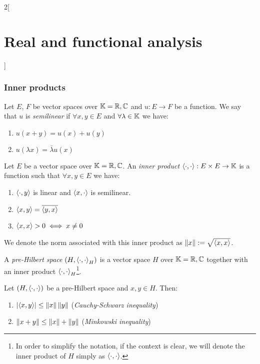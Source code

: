 \documentclass[../../../main_math.tex]{subfiles}
\begin{document}
\begin{multicols}{2}[\section{Real and functional analysis}]
  \subsubsection{Inner products}
  \begin{definition}
    Let $E$, $F$ be vector spaces over $\mathbb{K}=\mathbb{R},\mathbb{C}$ and $u:E\rightarrow F$ be a function. We say that $u$ is \emph{semilinear} if $\forall x,y\in E$ and $\forall\lambda\in \mathbb{K}$ we have:
    \begin{enumerate}
      \item $u(x+y)=u(x)+u(y)$
      \item $u(\lambda x)=\overline{\lambda}u(x)$
    \end{enumerate}
  \end{definition}
  \begin{definition}
    Let $E$ be a vector space over $\mathbb{K}=\mathbb{R},\mathbb{C}$. An \emph{inner product} ${\left\langle\cdot,\cdot\right\rangle}: E\times E\rightarrow\mathbb{K}$ is a function such that $\forall x,y\in E$ we have:
    \begin{enumerate}
      \item ${\left\langle\cdot,y\right\rangle}$ is linear and ${\left\langle x,\cdot\right\rangle}$ is semilinear.
      \item ${\left\langle x,y\right\rangle}=\overline{{\left\langle y,x\right\rangle}}$
      \item ${\left\langle x,x\right\rangle}>0 \iff x\ne 0$
    \end{enumerate}
    We denote the norm associated with this inner product as $\left\|x\right\|:=\sqrt{{\left\langle x,x\right\rangle}}$.
  \end{definition}
  \begin{definition}
    A \emph{pre-Hilbert space} $(H,{\left\langle\cdot,\cdot\right\rangle}_H)$ is a vector space $H$ over $\mathbb{K}=\mathbb{R},\mathbb{C}$ together with an inner product ${\left\langle\cdot,\cdot\right\rangle}_H$\footnote{In order to simplify the notation, if the context is clear, we will denote the inner product of $H$ simply as ${\left\langle\cdot,\cdot\right\rangle}$.}.
  \end{definition}
  \begin{proposition}
    Let $(H,{\left\langle\cdot,\cdot\right\rangle})$ be a pre-Hilbert space and $x,y\in H$. Then:
    \begin{enumerate}[ref = Cauchy-Schwarz inequality]
      \item\label{RFA:cauchyschwarz} $\displaystyle \abs{{\left\langle x,y\right\rangle}}\leq \left\|x\right\|\left\|y\right\|$ (\emph{Cauchy-Schwarz inequality})
      \item $\left\|x+y\right\|\leq \left\|x\right\| + \left\|y\right\|$ (\emph{Minkowski inequality})
    \end{enumerate}
  \end{proposition}

\end{multicols}
\end{document}
